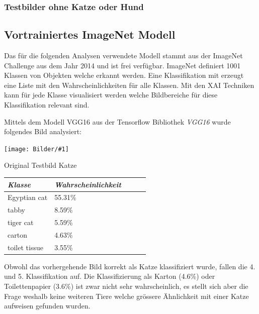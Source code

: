 \documentclass[
  12pt, %
  a4paper, %
  oneside, %
  openany, 
  numbers=noenddot, %
  BCOR=5mm, %
  parskip=half*, %
  thesis, %
]{bfhbook}
\newcommand{\imgText}[3]{
\begin{center}
    \begin{minipage}[t]{0.6\textwidth}
    		\vspace{0pt}
		\texttt{[image: Bilder/\#1]}
		\caption{#2}
	\end{minipage}\hfill
    \begin{minipage}[t]{0.4\textwidth}
    		\vspace{0pt}
  		#3
    \end{minipage}
\end{center}
}
\begin{document}
\subsubsection*{Testbilder ohne Katze oder Hund}

\subsection{Vortrainiertes ImageNet Modell}
Das für die folgenden Analysen verwendete Modell \parencite{Simonyan2014} stammt aus der ImageNet Challenge \parencite{imageNet} aus dem Jahr 2014 und ist frei verfügbar. ImageNet definiert 1001 Klassen von Objekten welche erkannt werden. Eine Klassifikation mit \parencite{TensorFlow} erzeugt eine Liste mit den Wahrscheinlichkeiten für alle Klassen. Mit den \gls{XAI} Techniken kann für jede Klasse visualisiert werden welche Bildbereiche für diese Klassifikation relevant sind.

Mittels dem Modell VGG16 aus der Tensorflow Bibliothek \textit{VGG16} \cite{vgg16} wurde folgendes Bild analysiert:
\imgText{Mira.jpg}{Original Testbild Katze}{
		
		\begin{tabular}{@{} *5l @{}}    \toprule
		\emph{Klasse} & \emph{Wahrscheinlichkeit} &&&  \\\midrule
		Egyptian cat & 55.31\% \\ 
		 tabby & 8.59\% \\ 
		 tiger cat & 5.59\% \\ 
		 carton & 4.63\% \\
		 toilet tissue & 3.55\% \\ \bottomrule
		 \hline
		\end{tabular}
}

Obwohl das vorhergehende Bild korrekt als Katze klassifiziert wurde, fallen die 4. und 5. Klassifikation auf. Die Klassifizierung als Karton (4.6\%) oder Toilettenpapier (3.6\%) ist zwar nicht sehr wahrscheinlich, es stellt sich aber die Frage weshalb keine weiteren Tiere welche grössere Ähnlichkeit mit einer Katze aufweisen gefunden wurden.
\end{document}

